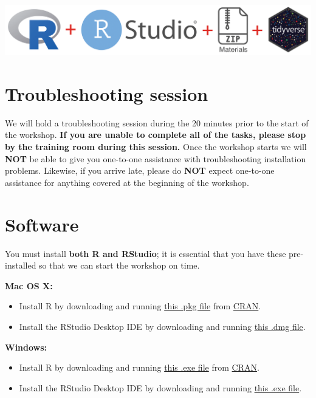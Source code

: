\documentclass[
]{book}
\providecommand{\tightlist}{%
  \setlength{\itemsep}{0pt}\setlength{\parskip}{0pt}}
\begin{document}
\includegraphics{R/Rinstall/images/install_software_R.png}

\hypertarget{troubleshooting-session}{%
\section{Troubleshooting session}\label{troubleshooting-session}}

We will hold a troubleshooting session during the 20 minutes prior to the start of the workshop.
\textbf{If you are unable to complete all of the tasks, please stop by the training room during this session.}
Once the workshop starts we will \textbf{NOT} be able to give you one-to-one assistance with troubleshooting installation problems. Likewise, if you arrive late, please do \textbf{NOT} expect one-to-one assistance for anything covered at the beginning of the workshop.

\hypertarget{software}{%
\section{Software}\label{software}}

You must install \textbf{both R and RStudio}; it is essential that you have these pre-installed so that we can start the workshop on time.

\textbf{Mac OS X:}

\begin{itemize}
\tightlist
\item
  Install R by downloading and running \href{http://cran.r-project.org/bin/macosx/R-latest.pkg}{this .pkg file} from \href{http://cran.r-project.org/index.html}{CRAN}.
\item
  Install the RStudio Desktop IDE by downloading and running \href{https://download1.rstudio.org/desktop/macos/RStudio-1.2.5033.dmg}{this .dmg file}.
\end{itemize}

\textbf{Windows:}

\begin{itemize}
\tightlist
\item
  Install R by downloading and running \href{https://cran.r-project.org/bin/windows/base/release.htm}{this .exe file} from \href{http://cran.r-project.org/index.html}{CRAN}.
\item
  Install the RStudio Desktop IDE by downloading and running \href{https://download1.rstudio.org/desktop/windows/RStudio-1.2.5033.exe}{this .exe file}.
\end{itemize}
\end{document}
